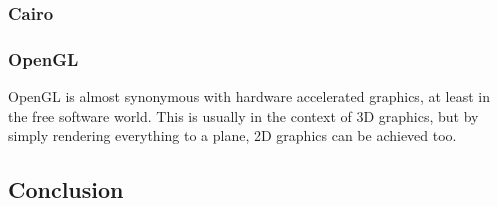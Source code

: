 \documentclass[12pt]{article}
\begin{document}
   \subsubsection{Cairo}
   \subsubsection{OpenGL}
    OpenGL is almost synonymous with hardware accelerated graphics, at least in the free software world. This is usually in the context of 3D graphics, but by simply rendering everything to a plane, 2D graphics can be achieved too.
  \subsection{Conclusion}
\end{document}
